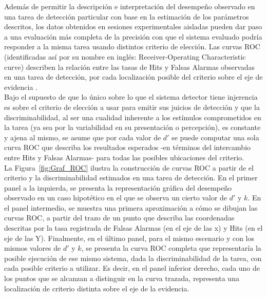 Además de permitir la descripción e interpretación del desempeño observado en una tarea de detección particular con base en la estimación de los parámetros descritos, los datos obtenidos en sesiones experimentales aisladas pueden dar paso a una evaluación más completa de la precisión con que el sistema evaluado podría responder a la misma tarea usando distintos criterio de elección. Las curvas ROC (identificadas así por su nombre en inglés: Receiver-Operating Characteristic curve) describen la relación entre las tasas de Hits y Falsas Alarmas observadas en una tarea de detección, por cada localización posible del criterio sobre el eje de evidencia \parencite{McNicol2, Swets1973}.\\

Bajo el supuesto de que lo único sobre lo que el sistema detector tiene injerencia es sobre el criterio de elección a usar para emitir sus juicios de detección y que la discriminabilidad, al ser una cualidad inherente a los estímulos comprometidos en la tarea (ya sea por la variabilidad en su presentación o percepción), es constante y ajena al mismo, se asume que por cada valor de $d'$ se puede computar una sola curva ROC que describa los resultados esperados -en términos del intercambio entre Hits y Falsas Alarmas- para todas las posibles ubicaciones del criterio.\\

La Figura~\ref{fig:Graf_ROC} ilustra la construcción de curvas ROC a partir de el criterio y la discriminabilidad estimados en una tarea de detección. En el primer panel a la izquierda, se presenta la representación gráfica del desempeño observado en un caso hipotético en el que se observa un cierto valor de $d'$ y $k$. En el panel intermedio, se muestra una primera aproximación a cómo se dibujan las curvas ROC, a partir del trazo de un punto que describa las coordenadas descritas por la tasa registrada de Falsas Alarmas (en el eje de las x) y Hits (en el eje de las Y). Finalmente, en el último panel, para el mismo escenario y con los mismos valores de $d'$ y $k$, se presenta la curva ROC completa que representaría la posible ejecución de ese mismo sistema, dada la discriminabilidad de la tarea, con cada posible criterio a utilizar. Es decir, en el panel inferior derecho, cada uno de los puntos que se alcanzan a distinguir en la curva trazada, representa una localización de criterio distinta sobre el eje de la evidencia.\\

